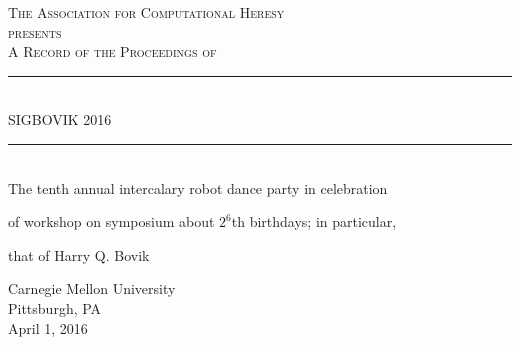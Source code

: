 \documentclass{article}
\begin{document}
\setmainfont{Splotch.ttf}
\setsansfont{Birbaslo.ttf}

\newcommand{\HRule}{\rule{\linewidth}{0.5mm}}

\begin{titlepage}
\begin{center}

\textsc{\LARGE The Association for Computational Heresy}\\[0.5cm]

\textsc{\large presents}\\[1cm]

\textsc{\Large A Record of the Proceedings of}\\[0.5cm]
\HRule \\[0.4cm]
{ \Huge \sf SIGBOVIK 2016 \\[0.4cm] }

\HRule \\[2cm]


The tenth annual intercalary robot dance party in celebration

of workshop on symposium about $2^6$th birthdays; in particular,

that of Harry Q. Bovik

\vfill

{\Large Carnegie Mellon University\\[0.25cm]
Pittsburgh, PA\\[0.3cm]
April 1, 2016}

\end{center}
\end{titlepage}
\end{document}

